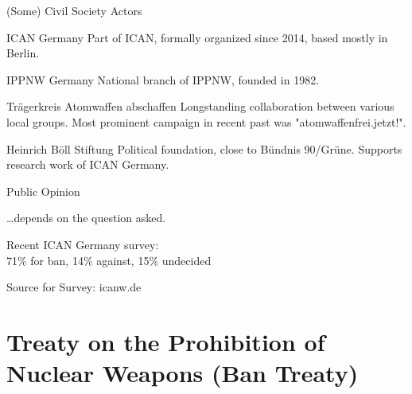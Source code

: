 \documentclass[presentation]{beamer}
\begin{document}
\begin{frame}[label={sec:orgef7bd94}]{(Some) Civil Society Actors}
\begin{block}{ICAN Germany}
Part of ICAN, formally organized since 2014, based mostly in Berlin.
\end{block}

\begin{block}{IPPNW Germany}
National branch of IPPNW, founded in 1982.
\end{block}

\begin{block}{Trägerkreis Atomwaffen abschaffen}
Longstanding collaboration between various local groups. Most prominent campaign in recent past was "atomwaffenfrei.jetzt!".
\end{block}

\begin{block}{Heinrich Böll Stiftung}
Political foundation, close to Bündnis 90/Grüne. Supports research work of ICAN Germany.
\end{block}
\end{frame}


\begin{frame}[label={sec:org10ca172}]{Public Opinion}
\begin{center}
\Large

\ldots{}depends on the question asked.\\[1.5em]

\small

Recent ICAN Germany survey:\\
71\% for ban, 14\% against, 15\% undecided

\end{center}

\hfill \tiny Source for Survey: icanw.de
\end{frame}

\section{Treaty on the Prohibition of Nuclear Weapons (Ban Treaty)}
\label{sec:org0af576b}
\end{document}
